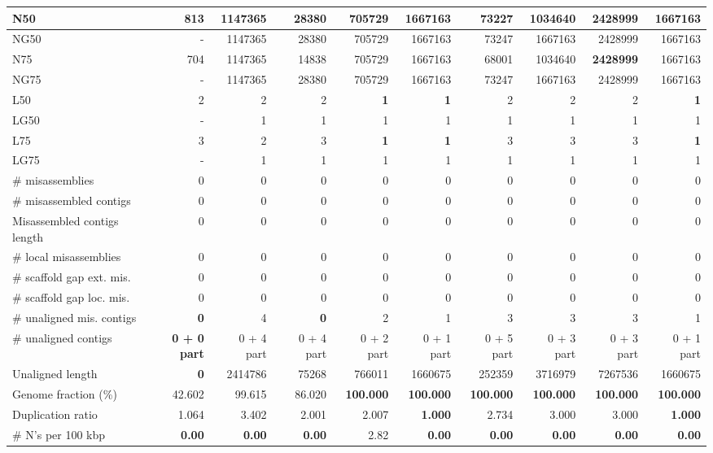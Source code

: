 \documentclass[12pt,a4paper]{article}
\begin{document}
\begin{table}[ht]
\begin{center}
\begin{tabular}{|l*{9}{|r}|}
N50 & 813 & 1147365 & 28380 & 705729 & 1667163 & 73227 & 1034640 & {\bf 2428999} & 1667163 \\ \hline
NG50 & - & 1147365 & 28380 & 705729 & 1667163 & 73247 & 1667163 & 2428999 & 1667163 \\ \hline
N75 & 704 & 1147365 & 14838 & 705729 & 1667163 & 68001 & 1034640 & {\bf 2428999} & 1667163 \\ \hline
NG75 & - & 1147365 & 28380 & 705729 & 1667163 & 73247 & 1667163 & 2428999 & 1667163 \\ \hline
L50 & 2 & 2 & 2 & {\bf 1} & {\bf 1} & 2 & 2 & 2 & {\bf 1} \\ \hline
LG50 & - & 1 & 1 & 1 & 1 & 1 & 1 & 1 & 1 \\ \hline
L75 & 3 & 2 & 3 & {\bf 1} & {\bf 1} & 3 & 3 & 3 & {\bf 1} \\ \hline
LG75 & - & 1 & 1 & 1 & 1 & 1 & 1 & 1 & 1 \\ \hline
\# misassemblies & 0 & 0 & 0 & 0 & 0 & 0 & 0 & 0 & 0 \\ \hline
\# misassembled contigs & 0 & 0 & 0 & 0 & 0 & 0 & 0 & 0 & 0 \\ \hline
Misassembled contigs length & 0 & 0 & 0 & 0 & 0 & 0 & 0 & 0 & 0 \\ \hline
\# local misassemblies & 0 & 0 & 0 & 0 & 0 & 0 & 0 & 0 & 0 \\ \hline
\# scaffold gap ext. mis. & 0 & 0 & 0 & 0 & 0 & 0 & 0 & 0 & 0 \\ \hline
\# scaffold gap loc. mis. & 0 & 0 & 0 & 0 & 0 & 0 & 0 & 0 & 0 \\ \hline
\# unaligned mis. contigs & {\bf 0} & 4 & {\bf 0} & 2 & 1 & 3 & 3 & 3 & 1 \\ \hline
\# unaligned contigs & {\bf 0 + 0 part} & 0 + 4 part & 0 + 4 part & 0 + 2 part & 0 + 1 part & 0 + 5 part & 0 + 3 part & 0 + 3 part & 0 + 1 part \\ \hline
Unaligned length & {\bf 0} & 2414786 & 75268 & 766011 & 1660675 & 252359 & 3716979 & 7267536 & 1660675 \\ \hline
Genome fraction (\%) & 42.602 & 99.615 & 86.020 & {\bf 100.000} & {\bf 100.000} & {\bf 100.000} & {\bf 100.000} & {\bf 100.000} & {\bf 100.000} \\ \hline
Duplication ratio & 1.064 & 3.402 & 2.001 & 2.007 & {\bf 1.000} & 2.734 & 3.000 & 3.000 & {\bf 1.000} \\ \hline
\# N's per 100 kbp & {\bf 0.00} & {\bf 0.00} & {\bf 0.00} & 2.82 & {\bf 0.00} & {\bf 0.00} & {\bf 0.00} & {\bf 0.00} & {\bf 0.00} \\ \hline

\end{tabular}
\end{center}
\end{table}
\end{document}
